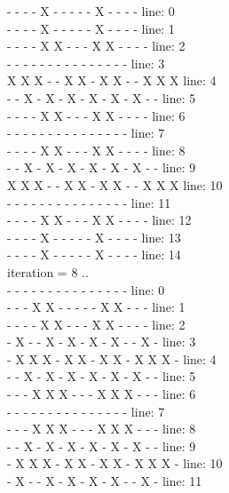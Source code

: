 \documentclass[a4paper, 14pt]{article}
\begin{document}
\begin{enumerate}
{ -  -  -  -  X  -  -  -  -  -  X  -  -  -  - 	line: 0\\
 -  -  -  -  X  -  -  -  -  -  X  -  -  -  - 	line: 1\\
 -  -  -  -  X  X  -  -  -  X  X  -  -  -  - 	line: 2\\
 -  -  -  -  -  -  -  -  -  -  -  -  -  -  - 	line: 3\\
 X  X  X  -  -  X  X  -  X  X  -  -  X  X  X 	line: 4\\
 -  -  X  -  X  -  X  -  X  -  X  -  X  -  - 	line: 5\\
 -  -  -  -  X  X  -  -  -  X  X  -  -  -  - 	line: 6\\
 -  -  -  -  -  -  -  -  -  -  -  -  -  -  - 	line: 7\\
 -  -  -  -  X  X  -  -  -  X  X  -  -  -  - 	line: 8\\
 -  -  X  -  X  -  X  -  X  -  X  -  X  -  - 	line: 9\\
 X  X  X  -  -  X  X  -  X  X  -  -  X  X  X 	line: 10\\
 -  -  -  -  -  -  -  -  -  -  -  -  -  -  - 	line: 11\\
 -  -  -  -  X  X  -  -  -  X  X  -  -  -  - 	line: 12\\
 -  -  -  -  X  -  -  -  -  -  X  -  -  -  - 	line: 13\\
 -  -  -  -  X  -  -  -  -  -  X  -  -  -  - 	line: 14\\
\newpage
iteration = 8 ..\\
 -  -  -  -  -  -  -  -  -  -  -  -  -  -  - 	line: 0\\
 -  -  -  X  X  -  -  -  -  -  X  X  -  -  - 	line: 1\\
 -  -  -  -  X  X  -  -  -  X  X  -  -  -  - 	line: 2\\
 -  X  -  -  X  -  X  -  X  -  X  -  -  X  - 	line: 3\\
 -  X  X  X  -  X  X  -  X  X  -  X  X  X  - 	line: 4\\
 -  -  X  -  X  -  X  -  X  -  X  -  X  -  - 	line: 5\\
 -  -  -  X  X  X  -  -  -  X  X  X  -  -  - 	line: 6\\
 -  -  -  -  -  -  -  -  -  -  -  -  -  -  - 	line: 7\\
 -  -  -  X  X  X  -  -  -  X  X  X  -  -  - 	line: 8\\
 -  -  X  -  X  -  X  -  X  -  X  -  X  -  - 	line: 9\\
 -  X  X  X  -  X  X  -  X  X  -  X  X  X  - 	line: 10\\
 -  X  -  -  X  -  X  -  X  -  X  -  -  X  - 	line: 11\\
}
\end{enumerate}
\end{document}
